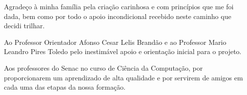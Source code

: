 \documentclass[
    12pt,               %
    openright,          %
    oneside,            %
    a4paper,            %
    english,            %
    brazil              %
    ]{abntex2}
\begin{document}
\frenchspacing

\imprimircapa

\imprimirfolhaderosto


\begin{agradecimentos}
    Agradeço à minha família pela criação carinhosa e com princípios que 
    me foi dada, bem como por todo o apoio incondicional recebido neste 
    caminho que decidi trilhar.

    Ao Professor Orientador Afonso Cesar Lelis Brandão e ao Professor Mario 
    Leandro Pires Toledo pelo inestimável apoio e orientação inicial para o 
    projeto.

    Aos professores do Senac no curso de Ciência da Computação, 
    por proporcionarem um aprendizado de alta qualidade e por servirem de 
    amigos em cada uma das etapas da nossa formação.
\end{agradecimentos}

 \begin{epigrafe} 
     \vspace*{\fill}
    \begin{flushright}
        \textit{}
    \end{flushright}
 \end{epigrafe}
\end{document}
